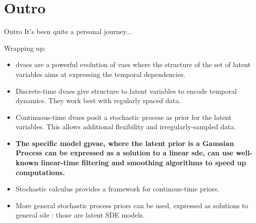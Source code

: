\section{Outro}\label{outro}

\begin{frame}{Outro}
    It's been quite a personal journey...

Wrapping up:

    \begin{itemize}
        \item \glspl{dvae} are a powerful evolution of \glspl{vae} where the structure of the set of latent variables 
        aims at expressing the temporal dependencies.
        \item Discrete-time \glspl{dvae} give structure to latent variables to encode temporal dynamics. They work best with regularly spaced data.
        \item Continuous-time \glspl{dvae} posit a stochastic process as prior for the latent variables. This allows 
        additional flexibility and irregularly-sampled data.
        \item \textbf{The specific model \gls{gpvae}, where the latent prior is a Gaussian Process can be expressed as a 
        solution to a linear \gls{sde}, can use well-known linear-time filtering and smoothing algorithms to speed up 
        computations.}
        \item Stochastic calculus provides a framework for continous-time priors.
        \item More general stochastic process priors can be used, expressed as solutions to general \gls{sde} :
        those are latent SDE models.
    \end{itemize}
\end{frame}

